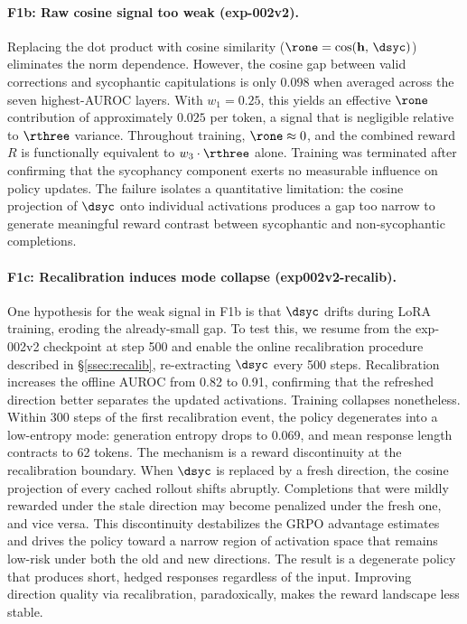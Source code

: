 \paragraph{F1b: Raw cosine signal too weak (exp-002v2).}
Replacing the dot product with cosine similarity ($\rone = \cos(\mathbf{h},\, \dsyc)$) eliminates the norm dependence.
However, the cosine gap between valid corrections and sycophantic capitulations is only 0.098 when averaged across the seven highest-AUROC layers.
With $w_1{=}0.25$, this yields an effective $\rone$ contribution of approximately $0.025$ per token, a signal that is negligible relative to $\rthree$ variance.
Throughout training, $\rone \approx 0$, and the combined reward $R$ is functionally equivalent to $w_3 \cdot \rthree$ alone.
Training was terminated after confirming that the sycophancy component exerts no measurable influence on policy updates.
The failure isolates a quantitative limitation: the cosine projection of $\dsyc$ onto individual activations produces a gap too narrow to generate meaningful reward contrast between sycophantic and non-sycophantic completions.

\paragraph{F1c: Recalibration induces mode collapse (exp002v2-recalib).}
One hypothesis for the weak signal in F1b is that $\dsyc$ drifts during LoRA training, eroding the already-small gap.
To test this, we resume from the exp-002v2 checkpoint at step 500 and enable the online recalibration procedure described in \S\ref{ssec:recalib}, re-extracting $\dsyc$ every 500 steps.
Recalibration increases the offline AUROC from 0.82 to 0.91, confirming that the refreshed direction better separates the updated activations.
Training collapses nonetheless.
Within 300 steps of the first recalibration event, the policy degenerates into a low-entropy mode: generation entropy drops to 0.069, and mean response length contracts to 62 tokens.
The mechanism is a reward discontinuity at the recalibration boundary.
When $\dsyc$ is replaced by a fresh direction, the cosine projection of every cached rollout shifts abruptly.
Completions that were mildly rewarded under the stale direction may become penalized under the fresh one, and vice versa.
This discontinuity destabilizes the GRPO advantage estimates and drives the policy toward a narrow region of activation space that remains low-risk under both the old and new directions.
The result is a degenerate policy that produces short, hedged responses regardless of the input.
Improving direction quality via recalibration, paradoxically, makes the reward landscape less stable.

